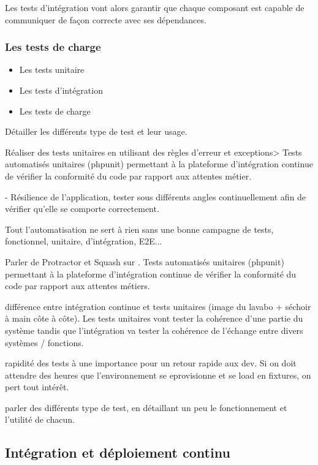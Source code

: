 
Les tests d'intégration vont alors garantir que chaque composant est capable de communiquer de façon correcte avec ses dépendances.

\subsubsection{Les tests de charge}

\begin{itemize}
	\setlength\itemsep{0em}
	\item Les tests unitaire
	\item Les tests d'intégration 
	\item Les tests de charge 
\end{itemize}


Détailler les différents type de test et leur usage.

Réaliser des tests unitaires en utilisant des règles d’erreur et exceptions> Tests automatisés unitaires (phpunit) permettant à la plateforme d'intégration continue de vérifier la conformité du code par rapport aux attentes métier.

- Résilience de l'application, tester sous différents angles continuellement afin de vérifier qu'elle se comporte correctement.

Tout l'automatisation ne sert à rien sans une bonne campagne de tests, fonctionnel, unitaire, d'intégration, E2E...

Parler de Protractor et Squash sur \bv. Tests automatisés unitaires (phpunit) permettant à la plateforme d'intégration continue de vérifier la conformité du code par rapport aux attentes métiers.

différence entre intégration continue et tests unitaires (image du lavabo + séchoir à main côte à côte). Les tests unitaires vont tester la cohérence d'une partie du système tandis que l'intégration va tester la cohérence de l'échange entre divers systèmes / fonctions.

rapidité des tests à une importance pour un retour rapide aux dev. Si on doit attendre des heures que l'environnement se eprovisionne et se load en fixtures, on pert tout intérêt.

parler des différents type de test, en détaillant un peu le fonctionnement et l'utilité de chacun.
\subsection{Intégration et déploiement continu}

